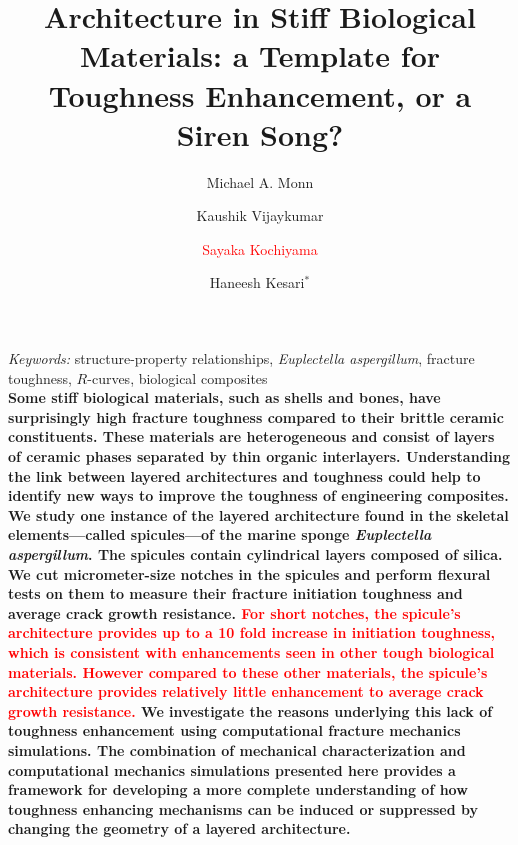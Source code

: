 \documentclass[12pt,onecolumn]{article}
\title{Architecture in Stiff Biological Materials: a Template for Toughness Enhancement, or a Siren Song?}
\author[1]{Michael A. Monn}
\author[1]{Kaushik Vijaykumar}
\author[1]{\textcolor{red}{Sayaka Kochiyama}}
\author[1]{Haneesh Kesari$^*$}
\affil[1]{School of Engineering, Brown University, Providence, RI, USA}
\date{}
\begin{document}
\maketitle
\emph{Keywords:}
structure-property relationships, 
\textit{Euplectella aspergillum}, 
fracture toughness, 
$R$-curves, 
biological composites
\\
{
\singlespacing\small \bf
Some stiff biological materials, such as shells and bones, have surprisingly high fracture toughness compared to their brittle ceramic constituents. These materials are heterogeneous and consist of layers of ceramic phases separated by thin organic interlayers. Understanding the link between layered architectures and toughness could help to identify new ways to improve the toughness of engineering composites. We study one instance of the layered architecture found in the skeletal elements---called spicules---of the marine sponge \textit{Euplectella aspergillum}. The spicules contain cylindrical layers composed of silica. We cut micrometer-size notches in the spicules and perform flexural tests on them to measure their fracture initiation toughness and average crack growth resistance. \textcolor{red}{For short notches, the spicule's architecture provides up to a 10 fold increase in initiation toughness, which is consistent with enhancements seen in other tough biological materials. However compared to these other materials, the spicule's architecture provides relatively little enhancement to average crack growth resistance.} We investigate the reasons underlying this lack of toughness enhancement using computational fracture mechanics simulations. The combination of mechanical characterization and computational mechanics simulations presented here provides a framework for developing a more complete understanding of how toughness enhancing mechanisms can be induced or suppressed by changing the geometry of a layered architecture.
}
\end{document}
